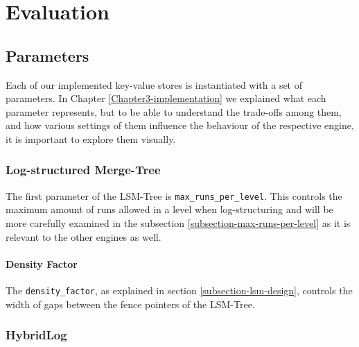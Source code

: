 
\chapter{Evaluation}

\label{Chapter4-evaluation}


\section{Parameters}

Each of our implemented key-value stores is instantiated with a set of parameters. In Chapter \ref{Chapter3-implementation} we explained what each parameter represents, but to be able to understand the trade-offs among them, and how various settings of them influence the behaviour of the respective engine, it is important to explore them visually.

\subsection{Log-structured Merge-Tree}

The first parameter of the LSM-Tree is \verb"max_runs_per_level". This controls the maximum amount of runs allowed in a level when log-structuring and will be more carefully examined in the subsection \ref{subsection-max-runs-per-level} as it is relevant to the other engines as well.

\subsubsection{Density Factor}

The \verb"density_factor", as explained in section \ref{subsection-lsm-design}, controls the width of gaps between the fence pointers of the LSM-Tree.





\subsection{HybridLog}


